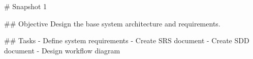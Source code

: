 
# Snapshot 1

## Objective
Design the base system architecture and requirements.

## Tasks
- Define system requirements
- Create SRS document
- Create SDD document
- Design workflow diagram

